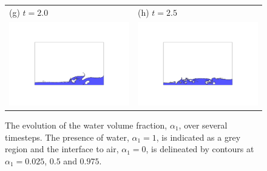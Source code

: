 \begin{figure}[tbp]
\begin{center}
\begin{tabular}{ll}
(g) $t = 2.0$ & (h) $t = 2.5$ \\
\includegraphics[width=7cm, trim=2.5cm 4.5cm 2.5cm 4.5cm, clip=true]{examples_images/water_collapse/water_collapse_400.png} & \includegraphics[width=7cm, trim=2.5cm 4.5cm 2.5cm 4.5cm, clip=true]{examples_images/water_collapse/water_collapse_500.png} \\
\end{tabular}
\caption{The evolution of the water volume fraction, $\alpha_1$, over several timesteps.  The presence of water, $\alpha_1=1$, is indicated as a grey region and the interface to air, $\alpha_1=0$, is delineated by contours at $\alpha_1 = 0.025$, $0.5$ and $0.975$.}
\label{fig:zhouwholea}
\end{center}
\end{figure}


